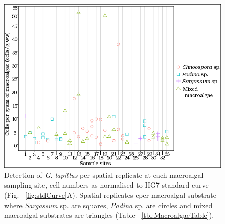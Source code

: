 \documentclass[12pt]{article}
\begin{document}
\begin{figure} 
\includegraphics[scale=.85]{Hero_qpcr-figs/Fig5_Env-sample-sites-plot_nov18.png} 
\caption{Detection of \emph{G. lapillus} per spatial replicate at each macroalgal sampling site, cell numbers as normalised to HG7 standard curve (Fig. ~\ref{fig:stdCurve}A). Spatial replicates cper macroalgal substrate where \emph{Sargassum} sp. are squares, \emph{Padina} sp. are circles and mixed macroalgal substrates are triangles (Table ~\ref{tbl:MacroalgaeTable}).} 
\label{fig:envHG7}
\end{figure} 
\FloatBarrier
\FloatBarrier

\newpage
\end{document}

